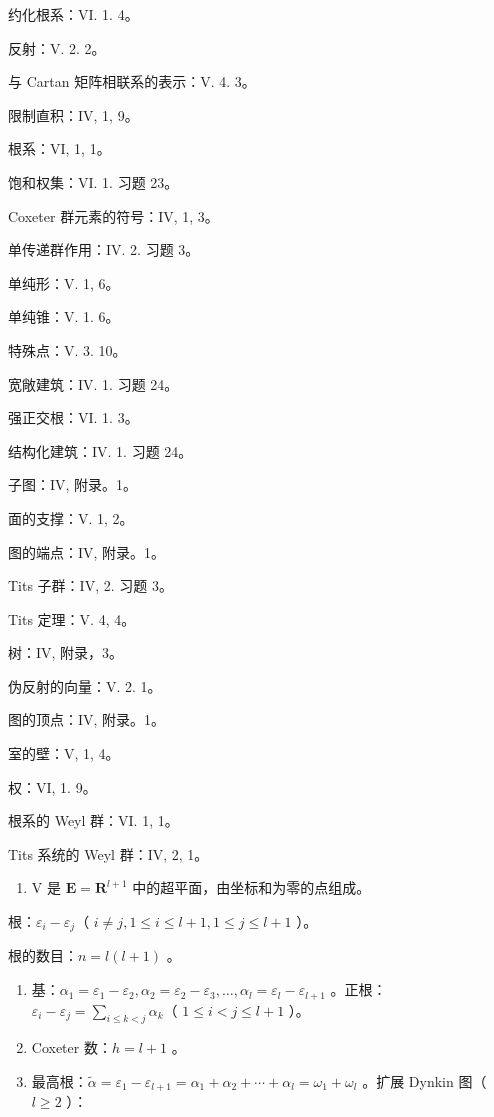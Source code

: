 约化根系：VI. 1. 4。

反射：V. 2. 2。

与 Cartan 矩阵相联系的表示：V. 4. 3。

限制直积：IV, 1, 9。

根系：VI, 1, 1。

饱和权集：VI. 1. 习题 23。

Coxeter 群元素的符号：IV, 1, 3。

单传递群作用：IV. 2. 习题 3。

单纯形：V. 1, 6。

单纯锥：V. 1. 6。

特殊点：V. 3. 10。

宽敞建筑：IV. 1. 习题 24。

强正交根：VI. 1. 3。

结构化建筑：IV. 1. 习题 24。

子图：IV, 附录。1。

面的支撑：V. 1, 2。

图的端点：IV, 附录。1。

Tits 子群：IV, 2. 习题 3。

Tits 定理：V. 4, 4。

树：IV, 附录，3。

伪反射的向量：V. 2. 1。

图的顶点：IV, 附录。1。

室的壁：V, 1, 4。

权：VI, 1. 9。

根系的 Weyl 群：VI. 1, 1。

Tits 系统的 Weyl 群：IV, 2, 1。


\begin{enumerate}
\def\labelenumi{(\Roman{enumi})}
\tightlist
\item
  V 是 \(\mathbf{E} = \mathbf{R}^{l + 1}\) 中的超平面，由坐标和为零的点组成。
\end{enumerate}

根：\(\varepsilon_{i} - \varepsilon_{j}\)（ \(i \neq j, 1 \leqslant i \leqslant l + 1, 1 \leqslant j \leqslant l + 1\) ）。

根的数目：\(n = l(l + 1)\) 。

\begin{enumerate}
\def\labelenumi{(\Roman{enumi})}
\setcounter{enumi}{1}
\item
  基：\(\alpha_{1} = \varepsilon_{1} - \varepsilon_{2},\alpha_{2} = \varepsilon_{2} - \varepsilon_{3},\ldots ,\alpha_{l} = \varepsilon_{l} - \varepsilon_{l + 1}\) 。正根：\(\varepsilon_{i} - \varepsilon_{j} = \sum_{i\leqslant k <   j}\alpha_{k}\)（ \(1\leqslant i <   j\leqslant l + 1\) ）。
\item
  Coxeter 数：\(h = l + 1\) 。
\item
  最高根：\(\tilde{\alpha} = \varepsilon_{1} - \varepsilon_{l+1} = \alpha_{1} + \alpha_{2} + \cdots + \alpha_{l} = \omega_{1} + \omega_{l}\) 。扩展 Dynkin 图（ \(l \geqslant 2\) ）：
\end{enumerate}

